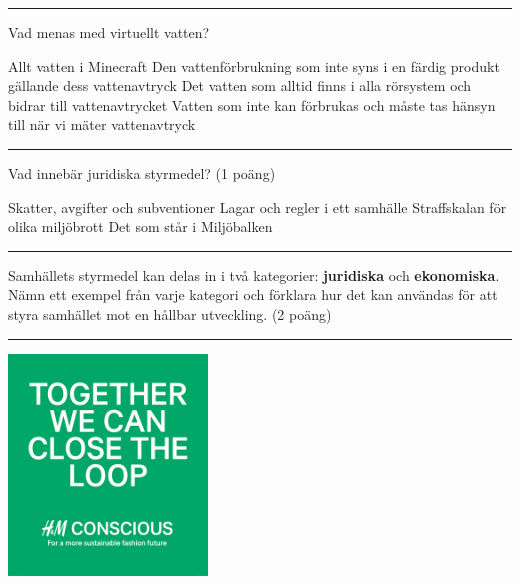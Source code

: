 \documentclass{exam}
\begin{document}
\begin{questions}
\vspace{5mm} 
\hrule 
\vspace{5mm} 

\question Vad menas med virtuellt vatten?
\vspace{2mm}
\begin{checkboxes}
    \choice Allt vatten i Minecraft
    \choice Den vattenförbrukning som inte syns i en färdig produkt gällande dess vattenavtryck
    \choice Det vatten som alltid finns i alla rörsystem och bidrar till vattenavtrycket
    \choice Vatten som inte kan förbrukas och måste tas hänsyn till när vi mäter vattenavtryck
\end{checkboxes}

\vspace{5mm} 
\hrule 
\vspace{5mm} 

\question Vad innebär juridiska styrmedel? (1 poäng)
\vspace{2mm}
\begin{checkboxes}
    \choice Skatter, avgifter och subventioner
    \choice Lagar och regler i ett samhälle
    \choice Straffskalan för olika miljöbrott
    \choice Det som står i Miljöbalken
\end{checkboxes}

\vspace{5mm} 
\hrule 
\vspace{5mm} 

\break

\question Samhällets styrmedel kan delas in i två kategorier: \textbf{juridiska} och \textbf{ekonomiska}. Nämn ett exempel från varje kategori och förklara hur det kan användas för att styra samhället mot en hållbar utveckling. (2 poäng)


\vspace{60mm} 
\hrule 
\vspace{5mm} 

\begin{center}
    \includegraphics[width=150pt]{image2.png}
\end{center}


\end{questions}
\end{document}
